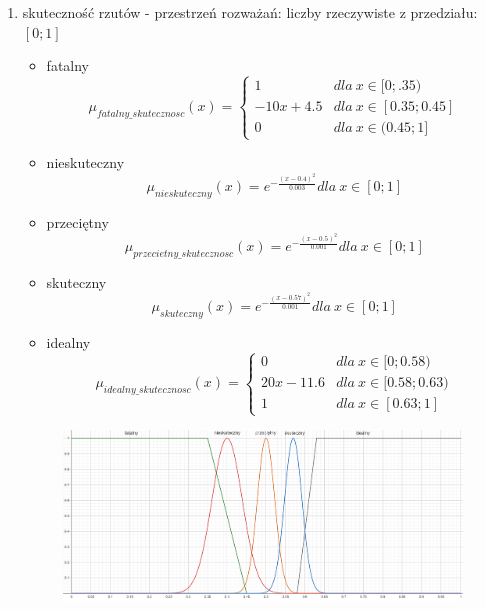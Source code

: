 \documentclass{classrep}
\begin{document}
\begin{enumerate}
    \item skuteczność rzutów - przestrzeń rozważań: liczby rzeczywiste z przedziału: $[0;1]$
     \begin{itemize}
        \item fatalny
        \begin{equation}
            \mu_{fatalny\_skutecznosc}(x) = \left\{\begin{matrix} 1 & dla \: x\in[0;.35) \\ -10x + 4.5 & dla \: x\in [0.35; 0.45] \\ 0 & dla \: x\in (0.45;1] \end{matrix}\right.
        \end{equation}
        \item nieskuteczny
        \begin{equation}
            \mu_{nieskuteczny}(x) = e^{-\frac{(x-0.4)^2}{0.003}} dla \: x \in [0;1]
        \end{equation}
        \item przeciętny
        \begin{equation}
            \mu_{przecietny\_skutecznosc}(x) = e^{-\frac{(x-0.5)^2}{0.001}} dla \: x \in [0;1]
        \end{equation}
        \item skuteczny
        \begin{equation}
            \mu_{skuteczny}(x) = e^{-\frac{(x-0.57)^2}{0.001}} dla \: x \in [0;1]
        \end{equation}
        \item idealny
        \begin{equation}
            \mu_{idealny\_skutecznosc}(x) = \left\{\begin{matrix} 0 & dla \: x\in [0;0.58) \\ 20x - 11.6 & dla \: x\in[0.58;0.63) \\ 1 & dla \: x\in [0.63;1] \end{matrix}\right.
        \end{equation}
    \end{itemize}
    \begin{figure}[H]
        \centering
        \includegraphics[width=14cm]{wykres_skutecznosc.png}

\end{figure}
\end{enumerate}
\end{document}
